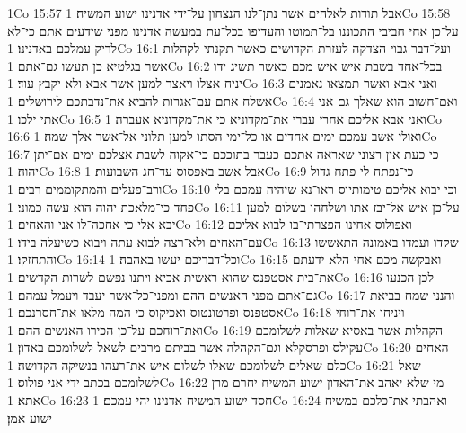1Co 15:57  אבל תודות לאלהים אשר נתן־לנו הנצחון על־ידי אדנינו ישוע המשיח׃
1Co 15:58  על־כן אחי חביבי התכוננו בל־תמוטו והעדיפו בכל־עת במעשה אדנינו מפני שידעים אתם כי־לא לריק עמלכם באדנינו׃
1Co 16:1  ועל־דבר גבוי הצדקה לעזרת הקדושים כאשר תקנתי לקהלות אשר בגלטיא כן תעשו גם־אתם׃
1Co 16:2  בכל־אחד בשבת איש איש מכם כאשר תשיג ידו יניח אצלו ויאצר למען אשר אבא ולא יקבץ עוד׃
1Co 16:3  ואני אבא ואשר תמצאו נאמנים אשלח אתם עם־אגרות להביא את־נדבתכם לירושלים׃
1Co 16:4  ואם־חשוב הוא שאלך גם אני אתי ילכו׃
1Co 16:5  ואני אבא אליכם אחרי עברי את־מקדוניא כי את־מקדוניא אעברה׃
1Co 16:6  ואולי אשב עמכם ימים אחדים או כל־ימי הסתו למען תלוני אל־אשר אלך שמה׃
1Co 16:7  כי כעת אין רצוני שאראה אתכם כעבר בתוככם כי־אקוה לשבת אצלכם ימים אם־יתן יהוה׃
1Co 16:8  אבל אשב באפסוס עד־חג השבועות׃
1Co 16:9  כי־נפתח לי פתח גדול ורב־פעלים והמתקוממים רבים׃
1Co 16:10  וכי יבוא אליכם טימותיוס ראו־נא שיהיה עמכם בלי פחד כי־מלאכת יהוה הוא עשה כמוני׃
1Co 16:11  על־כן איש אל־יבז אתו ושלחהו בשלום למען יבא אלי כי אחכה־לו אני והאחים׃
1Co 16:12  ואפולוס אחינו הפצרתי־בו לבוא אליכם עם־האחים ולא־רצה לבוא עתה ויבוא כשיעלה בידו׃
1Co 16:13  שקדו ועמדו באמונה התאששו והתחזקו׃
1Co 16:14  וכל־דבריכם יעשו באהבה׃
1Co 16:15  ואבקשה מכם אחי הלא ידעתם את־בית אסטפנס שהוא ראשית אכיא ויתנו נפשם לשרות הקדשים׃
1Co 16:16  לכן הכנעו גם־אתם מפני האנשים ההם ומפני־כל־אשר יעבד ויעמל עמהם׃
1Co 16:17  והנני שמח בביאת אסטפנס ופרטונטוס ואכיקוס כי המה מלאו את־חסרנכם׃
1Co 16:18  ויניחו את־רוחי ואת־רוחכם על־כן הכירו האנשים ההם׃
1Co 16:19  הקהלות אשר באסיא שאלות לשלומכם עקילס ופרסקלא וגם־הקהלה אשר בביתם מרבים לשאל לשלומכם באדון׃
1Co 16:20  האחים כלם שאלים לשלומכם שאלו לשלום איש את־רעהו בנשיקה הקדושה׃
1Co 16:21  שאל לשלומכם בכתב ידי אני פולוס׃
1Co 16:22  מי שלא יאהב את־האדון ישוע המשיח יחרם מרן אתא׃
1Co 16:23  חסד ישוע המשיח אדנינו יהי עמכם׃
1Co 16:24  ואהבתי את־כלכם במשיח ישוע אמן׃


